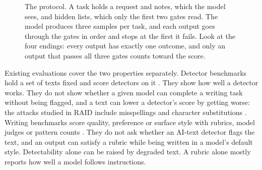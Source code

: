 \documentclass[10pt,twocolumn]{article}
\newcommand{\hb}{HumanBench}
\begin{document}
\begin{figure}[t]
\caption{The protocol. A task holds a request and notes, which the model sees, and hidden lists, which only the first two gates read. The model produces three samples per task, and each output goes through the gates in order and stops at the first it fails. Look at the four endings: every output has exactly one outcome, and only an output that passes all three gates counts toward the score.}
\label{fig:protocol}
\end{figure}

Existing evaluations cover the two properties separately. Detector benchmarks hold a set of texts fixed and score detectors on it \citep{dugan2024raid,li2023mage,wang2023m4,guo2023hc3}. They show how well a detector works. They do not show whether a given model can complete a writing task without being flagged, and a text can lower a detector's score by getting worse: the attacks studied in RAID include misspellings and character substitutions \citep{dugan2024raid}. Writing benchmarks score quality, preference or surface style with rubrics, model judges or pattern counts \citep{wu2025writingbench,fein2025litbench,roongta2026slopbench}. They do not ask whether an AI-text detector flags the text, and an output can satisfy a rubric while being written in a model's default style. Detectability alone can be raised by degraded text. A rubric alone mostly reports how well a model follows instructions.
\end{document}
